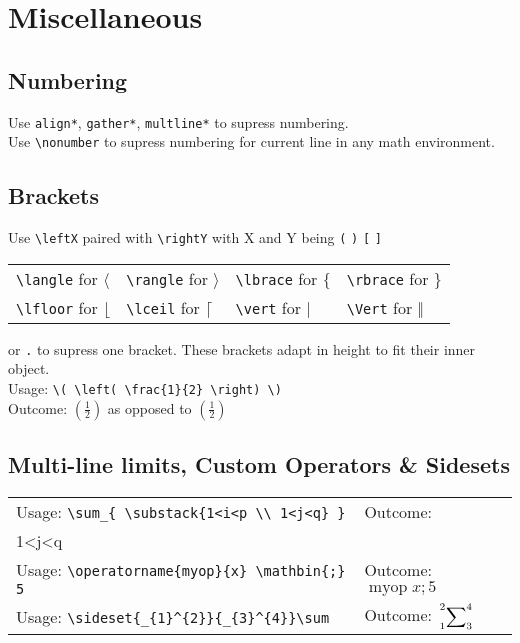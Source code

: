 \documentclass[draft]{cheatsht}
\begin{document}
\section{Miscellaneous}
\subsection{Numbering}    %
Use \verb!align*!, \verb!gather*!, \verb!multline*! to supress numbering.\\
Use \verb!\nonumber! to supress numbering for current line in
any math environment.

\subsection{Brackets}
Use \verb!\leftX! paired with \verb!\rightY! with X and Y being \verb!(!
\verb!)! \verb![! \verb!]!\\
\begin{tabular}{@{}llll@{}}
  \verb!\langle! for \(\langle\) & \verb!\rangle! for \(\rangle\) &
  \verb!\lbrace! for \(\lbrace\) & \verb!\rbrace! for  \(\rbrace\) \\
  \verb!\lfloor! for \(\lfloor\) & \verb!\lceil! for \(\lceil\) &
  \verb!\vert! for \(\vert\) & \verb!\Vert! for \(\Vert\)
\end{tabular}

or \verb!.! to supress one bracket. These brackets adapt in height to fit their
inner object.\\
Usage: \verb!\( \left( \frac{1}{2} \right) \)!\\
Outcome: \( \left( \frac{1}{2} \right) \) as opposed to \((\frac{1}{2})\)

\subsection{Multi-line limits, Custom Operators \& Sidesets}
\begin{tabular}{@{}ll@{}}
Usage: \verb!\sum_{ \substack{1<i<p \\ 1<j<q} }! &
  Outcome: \(\sum_{\substack{1<i<p\\1<j<q}}\) \\
Usage: \verb!\operatorname{myop}{x} \mathbin{;} 5! &
  Outcome: \(\operatorname{myop}{x} \mathbin{;} 5\)\\
Usage: \verb!\sideset{_{1}^{2}}{_{3}^{4}}\sum!&
  Outcome: \(\sideset{_{1}^{2}}{_{3}^{4}}\sum\)
\end{tabular}
\end{document}
